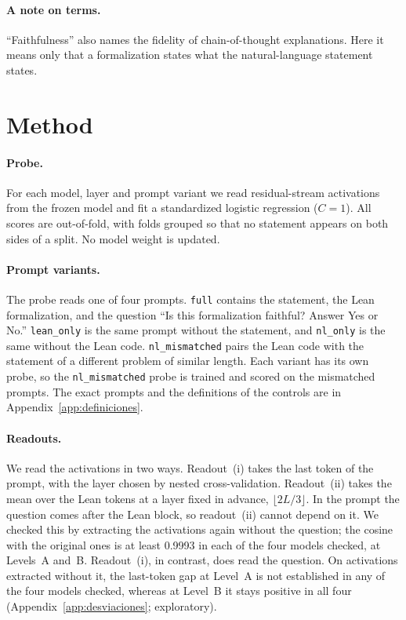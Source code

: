 \documentclass[10pt]{article}
\newcommand{\vr}[1]{\texttt{#1}}
\begin{document}
\paragraph{A note on terms.}
``Faithfulness'' also names the fidelity of chain-of-thought explanations. Here it means only that a formalization
states what the natural-language statement states.

\section{Method}

\paragraph{Probe.}
For each model, layer and prompt variant we read residual-stream activations from the frozen model and fit a
standardized logistic regression ($C = 1$). All scores are out-of-fold, with folds grouped so that no statement
appears on both sides of a split. No model weight is updated.

\paragraph{Prompt variants.}
The probe reads one of four prompts. \vr{full} contains the statement, the Lean formalization, and the question
``Is this formalization faithful? Answer Yes or No.'' \vr{lean\_only} is the same prompt without the statement, and \vr{nl\_only} is
the same without the Lean code. \vr{nl\_mismatched} pairs the Lean code with the statement of a different problem of similar
length.
Each variant has its own probe, so the \vr{nl\_mismatched} probe is trained and scored on the mismatched prompts.
The exact prompts and the definitions of the controls are in Appendix~\ref{app:definiciones}.

\paragraph{Readouts.}
We read the activations in two ways. Readout~(i) takes the last token of the prompt, with the layer chosen by
nested cross-validation. Readout~(ii) takes the mean over the Lean tokens at a layer fixed in advance,
$\lfloor 2L/3 \rfloor$.
In the prompt the question comes after the Lean block, so readout~(ii) cannot depend on it. We checked this by
extracting the activations again without the question; the cosine with the original ones is at least 0.9993 in each of the four models checked, at Levels~A and~B.
Readout~(i), in contrast, does read the question. On activations extracted without it, the last-token gap at Level~A
is not established in any of the four models checked, whereas at Level~B it stays positive in all four
(Appendix~\ref{app:desviaciones}; exploratory).
\end{document}
